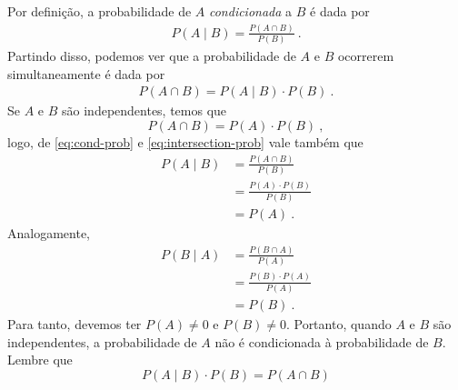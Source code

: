 \documentclass{article}
\begin{document}
            Por definição, a probabilidade de $A$ \emph{condicionada} a $B$ é dada por
            \begin{equation}
            \label{eq:cond-prob}
            \begin{aligned}
                P(A \mid B) = \frac{P(A \cap B)}{P(B)}\ .
            \end{aligned}
            \end{equation}
            Partindo disso, podemos ver que a probabilidade de $A$ e $B$ ocorrerem simultaneamente é dada por
            \begin{equation}
            \label{eq:intersection-prob}
            \begin{aligned}
                P(A \cap B) = P(A \mid B) \cdot P(B)\ .
            \end{aligned}
            \end{equation}
            Se $A$ e $B$ são independentes, temos que
            \begin{equation*}
                P(A \cap B) = P(A) \cdot P(B)\ ,
            \end{equation*}
            logo, de \eqref{eq:cond-prob} e \eqref{eq:intersection-prob} vale também que
            \begin{equation*}
            \begin{aligned}
                P(A \mid B) & = \frac{P(A \cap B)}{P(B)}\\
                & = \frac{P(A) \cdot P(B)}{P(B)}\\
                & = P(A)\ .
            \end{aligned}
            \end{equation*}
            Analogamente, 
            \begin{equation*}
            \begin{aligned}
                P(B \mid A) & = \frac{P(B \cap A)}{P(A)}\\
                & = \frac{P(B) \cdot P(A)}{P(A)}\\
                & = P(B)\ .
            \end{aligned}
            \end{equation*}
            Para tanto, devemos ter $P(A) \neq 0$ e $P(B) \neq 0$.
            Portanto, quando $A$ e $B$ são independentes, a probabilidade de $A$ não é condicionada à probabilidade de $B$.
            Lembre que
            \begin{equation*}
                P(A \mid B) \cdot P(B) = P(A \cap B)
            \end{equation*}
\end{document}
